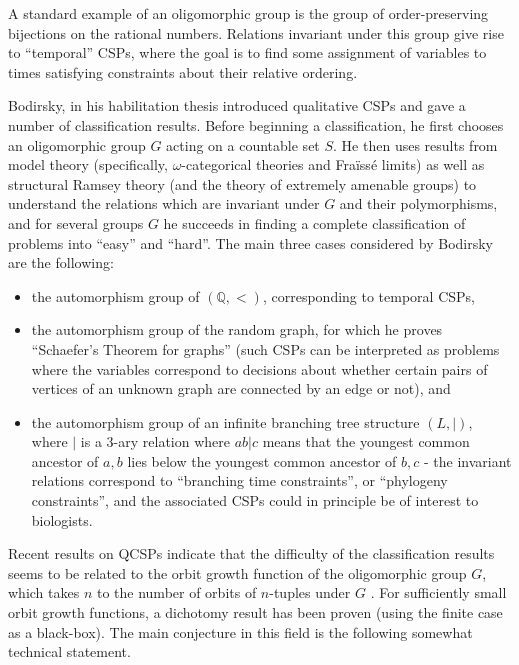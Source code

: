A standard example of an oligomorphic group is the group of order-preserving bijections on the rational numbers. Relations invariant under this group give rise to ``temporal'' CSPs, where the goal is to find some assignment of variables to times satisfying constraints about their relative ordering.

Bodirsky, in his habilitation thesis \cite{bodirsky-thesis} introduced qualitative CSPs and gave a number of classification results. Before beginning a classification, he first chooses an oligomorphic group $G$ acting on a countable set $S$. He then uses results from model theory (specifically, $\omega$-categorical theories and Fra\"iss\'e limits) as well as structural Ramsey theory (and the theory of extremely amenable groups) to understand the relations which are invariant under $G$ and their polymorphisms, and for several groups $G$ he succeeds in finding a complete classification of problems into ``easy'' and ``hard''. The main three cases considered by Bodirsky \cite{bodirsky-thesis} are the following:
\begin{itemize}
\item the automorphism group of $(\mathbb{Q},<)$, corresponding to temporal CSPs,

\item the automorphism group of the random graph, for which he proves ``Schaefer's Theorem for graphs'' (such CSPs can be interpreted as problems where the variables correspond to decisions about whether certain pairs of vertices of an unknown graph are connected by an edge or not), and

\item the automorphism group of an infinite branching tree structure $(L,|)$, where $|$ is a $3$-ary relation where $ab|c$ means that the youngest common ancestor of $a,b$ lies below the youngest common ancestor of $b,c$ - the invariant relations correspond to ``branching time constraints'', or ``phylogeny constraints'', and the associated CSPs could in principle be of interest to biologists.
\end{itemize}

Recent results on QCSPs indicate that the difficulty of the classification results seems to be related to the orbit growth function of the oligomorphic group $G$, which takes $n$ to the number of orbits of $n$-tuples under $G$ \cite{small-orbit-growth}. For sufficiently small orbit growth functions, a dichotomy result has been proven (using the finite case as a black-box). The main conjecture in this field is the following somewhat technical statement.

